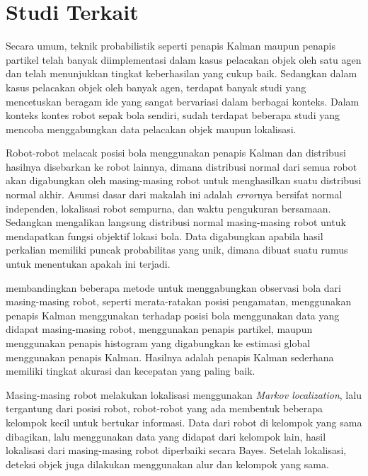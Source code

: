 \section{Studi Terkait}

Secara umum, teknik probabilistik seperti penapis Kalman maupun penapis partikel telah banyak diimplementasi dalam kasus pelacakan objek oleh satu agen dan telah menunjukkan tingkat keberhasilan yang cukup baik. Sedangkan dalam kasus pelacakan objek oleh banyak agen, terdapat banyak studi yang mencetuskan beragam ide yang sangat bervariasi dalam berbagai konteks. Dalam konteks kontes robot sepak bola sendiri, sudah terdapat beberapa studi yang mencoba menggabungkan data pelacakan objek maupun lokalisasi.

Robot-robot \citet{stroupe2001} melacak posisi bola menggunakan penapis Kalman dan distribusi hasilnya disebarkan ke robot lainnya, dimana distribusi normal dari semua robot akan digabungkan oleh masing-masing robot untuk menghasilkan suatu distribusi normal akhir. Asumsi dasar dari makalah ini adalah \textit{error}nya bersifat normal independen, lokalisasi robot sempurna, dan waktu pengukuran bersamaan. Sedangkan \citet{pinheiro2004} mengalikan langsung distribusi normal masing-masing robot untuk mendapatkan fungsi objektif lokasi bola. Data digabungkan apabila hasil perkalian memiliki puncak probabilitas yang unik, dimana dibuat suatu rumus untuk menentukan apakah ini terjadi.

\citet{ferrein2005} membandingkan beberapa metode untuk menggabungkan observasi bola dari masing-masing robot, seperti merata-ratakan posisi pengamatan, menggunakan penapis Kalman menggunakan terhadap posisi bola menggunakan data yang didapat masing-masing robot, menggunakan penapis partikel, maupun menggunakan penapis histogram yang digabungkan ke estimasi global menggunakan penapis Kalman. Hasilnya adalah penapis Kalman sederhana memiliki tingkat akurasi dan kecepatan yang paling baik.

Masing-masing robot \citet{pahliani2006} melakukan lokalisasi menggunakan \textit{Markov localization}, lalu tergantung dari posisi robot, robot-robot yang ada membentuk beberapa kelompok kecil untuk bertukar informasi. Data dari robot di kelompok yang sama dibagikan, lalu menggunakan data yang didapat dari kelompok lain, hasil lokalisasi dari masing-masing robot diperbaiki secara Bayes. Setelah lokalisasi, deteksi objek juga dilakukan menggunakan alur dan kelompok yang sama.

